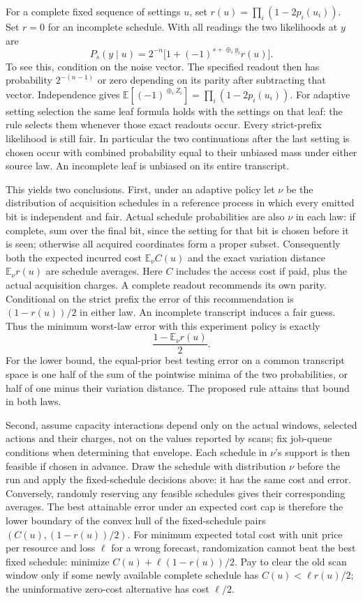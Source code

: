 \documentclass[11pt]{article}
\begin{document}
For a complete fixed sequence of settings \(u\), set
\(r(u)=\prod_i(1-2p_i(u_i))\). Set \(r=0\) for an incomplete schedule.
With all readings the two likelihoods at \(y\) are
\[
 P_s(y\mid u)=2^{-n}\bigl[1+(-1)^{s+\oplus_i y_i}r(u)\bigr].
\]
To see this, condition on the noise vector. The specified readout
then has probability \(2^{-(n-1)}\) or zero depending on its parity
after subtracting that vector. Independence gives
\(\mathbb E[(-1)^{\oplus_i Z_i}]=\prod_i(1-2p_i(u_i))\).
For adaptive setting selection the same leaf formula holds
with the settings on that leaf: the rule selects them whenever
those exact readouts occur. Every strict-prefix likelihood is
still fair. In particular the two continuations after the last
setting is chosen occur with combined probability equal to their
unbiased mass under either source law. An incomplete leaf is
unbiased on its entire transcript.

This yields two conclusions. First, under an adaptive policy let
\(\nu\) be the distribution of acquisition schedules in a reference
process in which every emitted bit is independent and fair.
Actual schedule probabilities are also \(\nu\) in each law:
if complete, sum over the final bit, since the setting for that
bit is chosen before it is seen; otherwise all acquired coordinates
form a proper subset. Consequently both the expected incurred
cost \(\mathbb E_\nu C(u)\) and the exact variation distance
\(\mathbb E_\nu r(u)\) are schedule averages. Here \(C\) includes
the access cost if paid, plus the actual acquisition charges.
A complete readout recommends its own parity. Conditional on
the strict prefix the error of this recommendation is
\((1-r(u))/2\) in either law. An incomplete transcript induces
a fair guess. Thus the minimum worst-law error with this
experiment policy is exactly
\[
         \frac{1-\mathbb E_\nu r(u)}2.
\]
For the lower bound, the equal-prior best testing error on a common
transcript space is one half of the sum of the pointwise minima
of the two probabilities, or half of one minus their variation
distance. The proposed rule attains that bound in both laws.

Second, assume capacity interactions depend only on the actual
windows, selected actions and their charges, not on the values
reported by scans; fix job-queue conditions when determining that
envelope. Each schedule in \(\nu\)'s support is then feasible if
chosen in advance. Draw the schedule with distribution \(\nu\)
before the run and apply the fixed-schedule decisions above:
it has the same cost and error. Conversely, randomly reserving
any feasible schedules gives their corresponding averages. The
best attainable error under an expected cost cap is therefore
the lower boundary of the convex hull of the fixed-schedule pairs
\((C(u),(1-r(u))/2)\). For minimum expected total cost with unit
price per resource and loss \(\ell\) for a wrong forecast,
randomization cannot beat the best fixed schedule:
minimize \(C(u)+\ell(1-r(u))/2\). Pay to clear the old scan
window only if some newly available complete schedule has
\(C(u)<\ell r(u)/2\); the uninformative zero-cost alternative has
cost \(\ell/2\).
\end{document}
